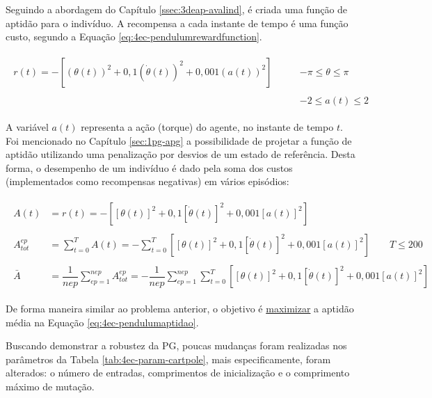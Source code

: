 Seguindo a abordagem do Capítulo \ref{ssec:3deap-avalind}, é criada uma função de aptidão para o indivíduo. A recompensa a cada instante de tempo é uma função custo, segundo a Equação \ref{eq:4ec-pendulumrewardfunction}.

\begin{align}\label{eq:4ec-pendulumrewardfunction}
\begin{split}
r(t) = - \left[(\theta(t))^2 + 0,1(\dot\theta(t))^2+0,001(a(t))^2\right]\qquad &-\pi \le \theta \le \pi\\\\
&-2 \le a(t) \le 2
\end{split}
\end{align}

A variável $a(t)$ representa a ação (torque) do agente, no instante de tempo $t$. Foi mencionado no Capítulo \ref{sec:1pg-apg} a possibilidade de projetar a função de aptidão utilizando uma penalização por desvios de um estado de referência. Desta forma, o desempenho de um indivíduo é dado pela soma dos custos (implementados como recompensas negativas) em vários episódios:

\begin{align}\label{eq:4ec-pendulumaptidao}
\begin{split}
A(t) &= r(t) = - \left[\left[\theta(t)\right]^2 + 0,1\left[\dot\theta(t)\right]^2+0,001\left[a(t)\right]^2\right]\\\\
A_{tot}^{ep} &= \sum_{t=0}^{T} A(t) = - \sum_{t=0}^{T} \left[
\left[\theta(t)\right]^2 + 0,1\left[\dot\theta(t)\right]^2+0,001\left[a(t)\right]^2
\right]\qquad T \le 200\\\\
\bar{A} &= \dfrac{1}{nep}\sum_{ep=1}^{nep} A_{tot}^{ep} =
-\dfrac{1}{nep}\sum_{ep=1}^{nep}\sum_{t=0}^{T} \left[
\left[\theta(t)\right]^2 + 0,1\left[\dot\theta(t)\right]^2+0,001\left[a(t)\right]^2
\right]
\end{split}
\end{align}

De forma maneira similar ao problema anterior, o objetivo é \underline{maximizar} a aptidão média na Equação \ref{eq:4ec-pendulumaptidao}.

Buscando demonstrar a robustez da PG, poucas mudanças foram realizadas nos parâmetros da Tabela \ref{tab:4ec-param-cartpole}, mais especificamente, foram alterados: o número de entradas, comprimentos de inicialização e o comprimento máximo de mutação.


